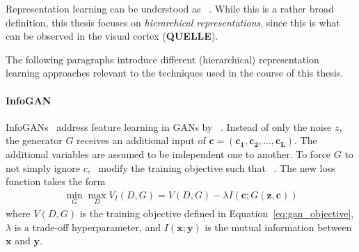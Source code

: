 Representation learning can be understood as ~\citep{bengio2013representation}.
While this is a rather broad definition, this thesis focuses on \textit{hierarchical representations}, since this is what can be observed in the visual cortex (\textbf{QUELLE}).

The following paragraphs introduce different (hierarchical) representation learning approaches relevant to the techniques used in the course of this thesis.

\paragraph{InfoGAN}
InfoGANs~\cite{chen2016infogan} address feature learning in \acp{GAN} by ~\citep{chen2016infogan}.
Instead of only the noise $z$, the generator $G$ receives an additional input of  $\bm{c} = (\bm{c_1}, \bm{c_2}, \dots, \bm{c_L})$.
The additional variables are assumed to be independent one to another.
To force $G$ to not simply ignore $c$,~\citet{chen2016infogan} modify the training objective such that ~\citep{chen2016infogan}.
The new loss function takes the form
\begin{align}
    \min _{G} \max _{D} V_I(D, G)=V(D, G) - \lambda I(\bm{c}; G(\bm{z}, \bm{c}))
\end{align}
where $V(D, G)$ is the training objective defined in Equation~\ref{eq:gan_objective}, $\lambda$ is a trade-off hyperparameter, and $I(\bm{x}; \bm{y})$ is the mutual information between $\bm{x}$ and $\bm{y}$.

